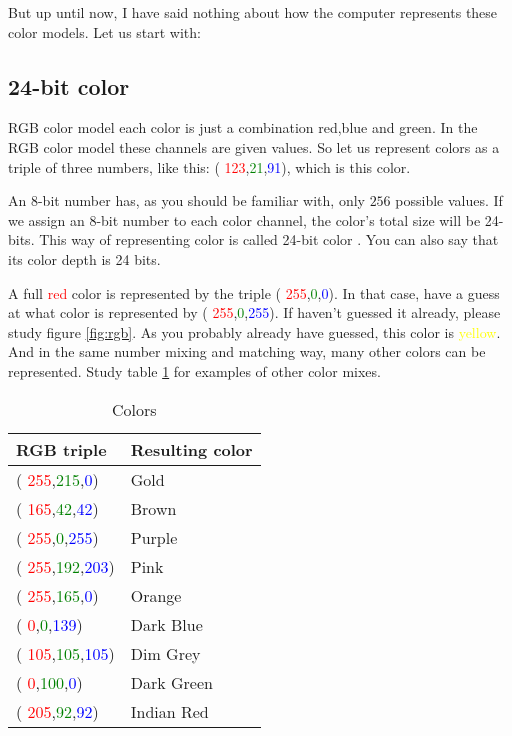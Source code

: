 \begin{refsection}
  \newcommand{\rgbtrip}[3]{( \textcolor{red}{#1},\textcolor{green}{#2},\textcolor{blue}{#3})}

  But up until now, I have said nothing about how the computer
  represents these color models. Let us start with:

  \subsection{24-bit color}
  \label{sec:24-bit-color}

  RGB color model each color is just a combination red,blue and
  green. In the RGB color model these channels are given values. So let
  us represent colors as a triple of three numbers, like this:
  \rgbtrip{123}{21}{91}, which is \textcolor[RGB]{123,21,91}{this color}.

  An 8-bit number has, as you should be familiar with, only $256$ possible values. If we
  assign an  8-bit number to each color channel, the color's total size
  will be 24-bits. This way of representing color is called 24-bit color
  . You can also say that its color depth  is 24 bits.

  \newcommand{\selfcolor}[1]{\textcolor{#1}{#1}}

  A full \selfcolor{red} color is represented by the triple \rgbtrip{255}{0}{0}. In
  that case, have a guess at what color is represented by
  \rgbtrip{255}{0}{255}. If haven't guessed it already, please study
  figure \ref{fig:rgb}. As you probably already have guessed, this color
  is \selfcolor{yellow}. And in the same number mixing and matching way, many other
  colors can be represented. Study table \ref{tab:color-examples} for
  examples of other color mixes.

  \newcommand{\colorrow}[4]{  \rgbtrip{#1}{#2}{#3} &
    \textcolor[RGB]{#1,#2,#3}{#4} \\ \hline}

  \begin{table}[h!]
    \centering
    \begin{tabular}[h!]{|l|l|}
      \hline
      RGB triple & Resulting color \\ \hline
      \colorrow{255}{215}{0}{Gold}
      \colorrow{165}{42}{42}{Brown}
      \colorrow{255}{0}{255}{Purple}
      \colorrow{255}{192}{203}{Pink}
      \colorrow{255}{165}{0}{Orange}
      \colorrow{0}{0}{139}{Dark Blue}
      \colorrow{105}{105}{105}{Dim Grey}
      \colorrow{0}{100}{0}{Dark Green}
      \colorrow{205}{92}{92}{Indian Red}
    \end{tabular}
    \caption{Colors}
    \label{tab:color-examples}
  \end{table}


\end{refsection}
